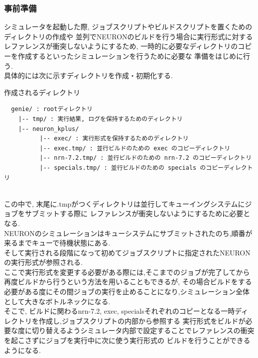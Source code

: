 \subsubsection{事前準備}
シミュレータを起動した際, ジョブスクリプトやビルドスクリプトを置くためのディレクトリの作成や
並列でNEURONのビルドを行う場合に実行形式に対するレファレンスが衝突しないようにするため,
一時的に必要なディレクトリのコピーを作成するといったシミュレーションを行うために必要な
準備をはじめに行う.\\
具体的には次に示すディレクトリを作成・初期化する.\\
\begin{table}[htb]
  \caption {作成されるディレクトリ}
{\footnotesize
\begin{framed}
\begin{verbatim}
  genie/ : rootディレクトリ
    |-- tmp/ : 実行結果, ログを保持するためのディレクトリ
    |-- neuron_kplus/
          |-- exec/ : 実行形式を保持するためのディレクトリ
          |-- exec.tmp/ : 並行ビルドのための exec のコピーディレクトリ
          |-- nrn-7.2.tmp/ : 並行ビルドのための nrn-7.2 のコピーディレクトリ
          |-- specials.tmp/ : 並行ビルドのための specials のコピーディレクトリ
\end{verbatim}
\end{framed}
}
\end{table}
\\
この中で, 末尾に.tmpがつくディレクトリは並行してキューイングシステムにジョブをサブミットする際に
レファレンスが衝突しないようにするために必要となる.\\
NEURONのシミュレーションはキューシステムにサブミットされたのち,順番が来るまでキューで待機状態にある.\\
そして実行される段階になって初めてジョブスクリプトに指定されたNEURONの実行形式が参照される.\\
ここで実行形式を変更する必要がある際には,そこまでのジョブが完了してから再度ビルドから行うという方法を用いることもできるが,
その場合ビルドをする必要がある度にその間ジョブの実行を止めることになり,シミュレーション全体として大きなボトルネックになる.\\
そこで, ビルドに関わるnrn-7.2, exec, specialsそれぞれのコピーとなる一時ディレクトリを作成し,ジョブスクリプトの内部から参照する
実行形式をビルドが必要な度に切り替えるようシミュレータ内部で設定することでレファレンスの衝突を起こさずにジョブを実行中に次に使う実行形式の
ビルドを行うことができるようになる.\\

